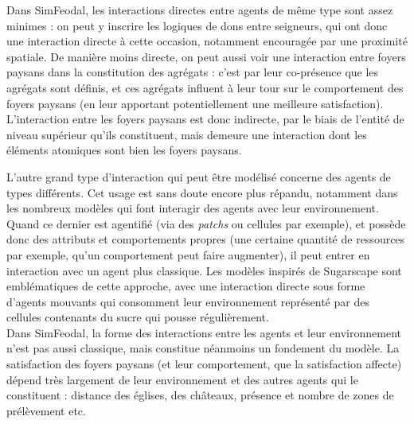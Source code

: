 Dans SimFeodal, les interactions directes entre agents de même type sont assez minimes : on peut y inscrire les logiques de dons entre seigneurs, qui ont donc une interaction directe à cette occasion, notamment encouragée par une proximité spatiale.
De manière moins directe, on peut aussi voir une interaction entre foyers paysans dans la constitution des agrégats : c'est par leur co-présence que les agrégats sont définis, et ces agrégats influent à leur tour sur le comportement des foyers paysans (en leur apportant potentiellement une meilleure satisfaction).
L'interaction entre les foyers paysans est donc indirecte, par le biais de l'entité de niveau supérieur qu'ils constituent, mais demeure une interaction dont les éléments atomiques sont bien les foyers paysans.

L'autre grand type d'interaction qui peut être modélisé concerne des agents de types différents.
Cet usage est sans doute encore plus répandu, notamment dans les nombreux modèles qui font interagir des agents avec leur environnement.
Quand ce dernier est agentifié (via des \textit{patchs} ou cellules par exemple), et possède donc des attributs et comportements propres (une certaine quantité de ressources par exemple, qu'un comportement peut faire augmenter), il peut entrer en interaction avec un agent plus classique.
Les modèles inspirés de \mbox{\og Sugarscape\fg{}} \autocite{epstein_growing_1996} sont emblématiques de cette approche, avec une interaction directe sous forme d'agents mouvants qui consomment leur environnement représenté par des cellules contenants du \og sucre\fg{} qui \og pousse\fg{} régulièrement.\\
Dans SimFeodal, la forme des interactions entre les agents et leur environnement n'est pas aussi classique, mais constitue néanmoins un fondement du modèle.
La satisfaction des foyers paysans (et leur comportement, que la satisfaction affecte) dépend très largement de leur environnement et des autres agents qui le constituent : distance des églises, des châteaux, présence et nombre de zones de prélèvement etc.

